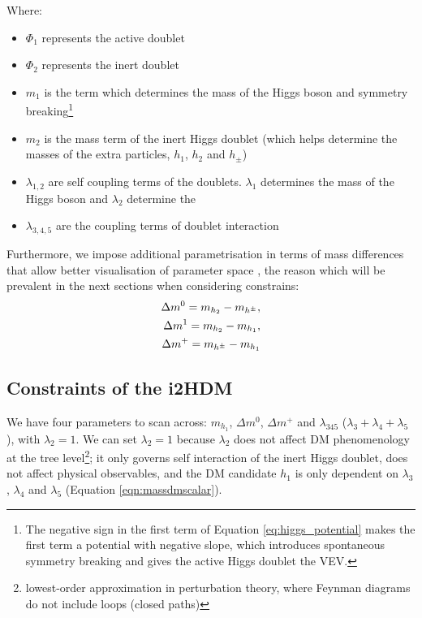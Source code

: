 \documentclass[12pt]{article}
\begin{document}
Where:
\begin{itemize}
    \item $\Phi_1$ represents the active doublet
    \item $\Phi_2$ represents the inert doublet
    \item $m_1$ is the term which determines the mass of the Higgs boson and symmetry breaking\footnote{The negative sign in the first term of Equation \ref{eq:higgs_potential} makes the first term a potential with negative slope, which introduces spontaneous symmetry breaking and gives the active Higgs doublet the VEV.}
    \item $m_2$ is the mass term of the inert Higgs doublet (which helps determine the masses of the extra particles, $h_1$, $h_2$ and $h_\pm$)
    \item $\lambda_{1, 2}$ are self coupling terms of the doublets. $\lambda_1$ determines the mass of the Higgs boson and $\lambda_2$ determine the 
    \item $\lambda_{3, 4, 5}$ are the coupling terms of doublet interaction
\end{itemize}
Furthermore, we impose additional parametrisation in terms of mass differences that allow better visualisation of parameter space \cite{Belyaev_2022}, the reason which will be prevalent in the next sections when considering constrains:
\begin{align}
\label{eq:mass_diff_1}
    \Delta m^{0} = m_{h_2} - m_{h^\pm},\\ \notag
    \Delta m^1 = m_{h_2} - m_{h_1},\\ \notag
    \Delta m^+ = m_{h^\pm} - m_{h_1}
\end{align}

\subsection{Constraints of the i2HDM}
We have four parameters to scan across: $m_{h_1}$, $\Delta m^0$, $\Delta m^+$ and $\lambda_{345}$ ($\lambda_3 + \lambda_4 + \lambda_5$), with $\lambda_2 = 1$. We can set $\lambda_2 = 1$ because $\lambda_2$ does not affect DM phenomenology at the tree level\footnote{lowest-order approximation in perturbation theory, where Feynman diagrams do not include loops (closed paths)}\cite{Belyaev:2016lok}; it only governs self interaction of the inert Higgs doublet, does not affect physical observables, and the DM candidate $h_1$ is only dependent on $\lambda_3$, $\lambda_4$ and $\lambda_5$ (Equation \ref{eqn:massdmscalar}). 
\end{document}
